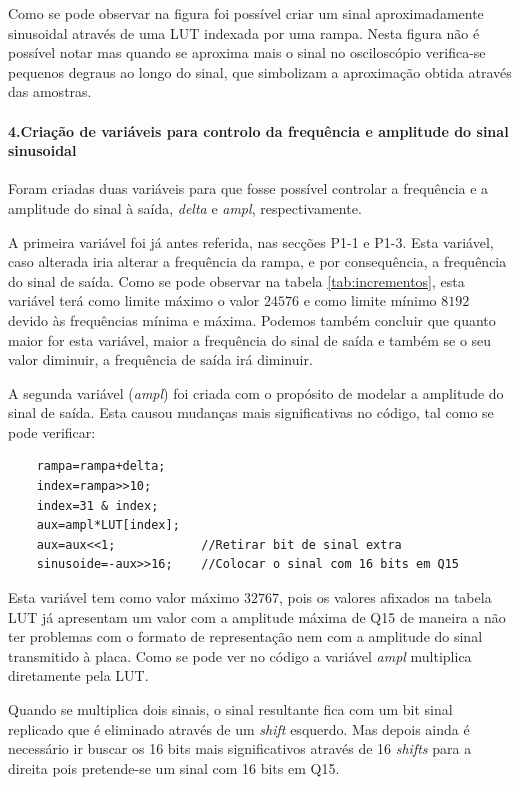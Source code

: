 \documentclass[11pt]{article}
\numberwithin{equation}{section}
\begin{document}
Como se pode observar na figura foi possível criar um sinal aproximadamente sinusoidal através de uma LUT indexada por uma rampa. Nesta figura não é possível notar mas quando se aproxima mais o sinal no osciloscópio verifica-se pequenos degraus ao longo do sinal, que simbolizam a aproximação obtida através das amostras.

\paragraph{4.Criação de variáveis para controlo da frequência e amplitude do sinal sinusoidal} \hspace{0pt}

Foram criadas duas variáveis para que fosse possível controlar a frequência e a amplitude do sinal à saída, \textit{delta} e \textit{ampl}, respectivamente.

A primeira variável foi já antes referida, nas secções P1-1 e P1-3. Esta variável, caso alterada iria alterar a frequência da rampa, e por consequência, a frequência do sinal de saída. Como se pode observar na tabela \ref{tab:incrementos}, esta variável terá como limite máximo o valor $ 24576 $ e como limite mínimo $ 8192 $ devido às frequências mínima e máxima. Podemos também concluir que quanto maior for esta variável, maior a frequência do sinal de saída e também se o seu valor diminuir, a frequência de saída irá diminuir.

A segunda variável (\textit{ampl}) foi criada com o propósito de modelar a amplitude do sinal de saída. Esta causou mudanças mais significativas no código, tal como se pode verificar:

\begin{lstlisting}
	rampa=rampa+delta;
	index=rampa>>10;
	index=31 & index;        
	aux=ampl*LUT[index];
	aux=aux<<1;            //Retirar bit de sinal extra
	sinusoide=-aux>>16;    //Colocar o sinal com 16 bits em Q15
\end{lstlisting}

Esta variável tem como valor máximo $ 32767 $, pois os valores afixados na tabela LUT já apresentam um valor com a amplitude máxima de Q15 de maneira a não ter problemas com o formato de representação nem com a amplitude do sinal transmitido à placa.
Como se pode ver no código a variável \textit{ampl} multiplica diretamente pela LUT. 
\vspace{2 mm}

Quando se multiplica dois sinais, o sinal resultante fica com um bit sinal replicado que é eliminado através de um \textit{shift} esquerdo. Mas depois ainda é necessário ir buscar os 16 bits mais significativos através de 16 \textit{shifts} para a direita pois pretende-se um sinal com 16 bits em Q15. 
\end{document}
